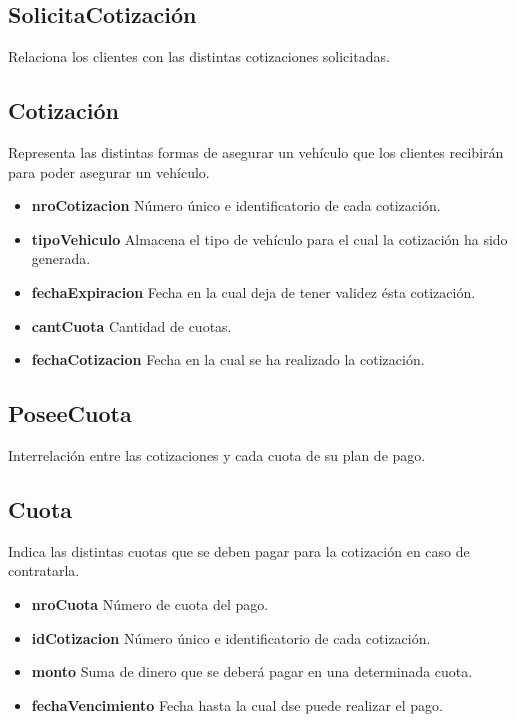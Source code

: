 \documentclass[a4paper,11pt]{article}
\begin{document}
\subsection{SolicitaCotización}

Relaciona los clientes con las distintas cotizaciones solicitadas.

\subsection{Cotización}

Representa las distintas formas de asegurar un vehículo que los clientes recibirán para poder asegurar
un vehículo.

\begin{itemize}

  \item \textbf{nroCotizacion} Número único e identificatorio de cada cotización.
  
  \item \textbf{tipoVehiculo} Almacena el tipo de vehículo para el cual la cotización ha sido generada.

  \item \textbf{fechaExpiracion} Fecha en la cual deja de tener validez ésta cotización.
  
  \item \textbf{cantCuota} Cantidad de cuotas.

  \item \textbf{fechaCotizacion} Fecha en la cual se ha realizado la cotización.
      
\end{itemize}

\subsection{PoseeCuota}

Interrelación entre las cotizaciones y cada cuota de su plan de pago.

\subsection{Cuota}

Indica las distintas cuotas que se deben pagar para la cotización en caso de contratarla.

\begin{itemize}

  \item \textbf{nroCuota} Número de cuota del pago.
    
  \item \textbf{idCotizacion} Número único e identificatorio de cada cotización.
  
  \item \textbf{monto} Suma de dinero que se deberá pagar en una determinada cuota.

  \item \textbf{fechaVencimiento} Fecha hasta la cual dse puede realizar el pago.

\end{itemize}
\end{document}
